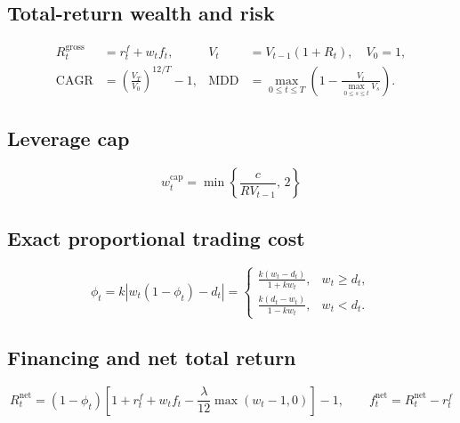 \documentclass[11pt]{article}
\begin{document}
\subsection*{Total-return wealth and risk}
\begin{equation}
\begin{aligned}R_t^{\mathrm{gross}}&=r_t^f+w_tf_t,&V_t&=V_{t-1}(1+R_t),\quad V_0=1,\\ \mathrm{CAGR}&=\left(\frac{V_T}{V_0}\right)^{12/T}-1,&\mathrm{MDD}&=\max_{0\leq t\leq T}\left(1-\frac{V_t}{\max_{0\leq s\leq t}V_s}\right).\end{aligned}
\end{equation}
\subsection*{Leverage cap}
\begin{equation}
w_t^{\mathrm{cap}}=\min\!\left\{\frac{c}{RV_{t-1}},\,2\right\}
\end{equation}
\subsection*{Exact proportional trading cost}
\begin{equation}
\phi_t=k\left|w_t(1-\phi_t)-d_t\right|=\begin{cases}\displaystyle\frac{k(w_t-d_t)}{1+kw_t},&w_t\geq d_t,\\[5pt]\displaystyle\frac{k(d_t-w_t)}{1-kw_t},&w_t<d_t.\end{cases}
\end{equation}
\subsection*{Financing and net total return}
\begin{equation}
R_t^{\mathrm{net}}=(1-\phi_t)\left[1+r_t^f+w_tf_t-\frac{\lambda}{12}\max(w_t-1,0)\right]-1,\qquad f_t^{\mathrm{net}}=R_t^{\mathrm{net}}-r_t^f
\end{equation}
\end{document}

